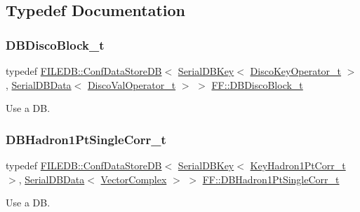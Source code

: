 \subsection{Typedef Documentation}
\mbox{\label{namespaceFF_afff37fccef0384964e1f8a8d20451ede}} 
\subsubsection{\texorpdfstring{DBDiscoBlock\_t}{DBDiscoBlock\_t}}
{\footnotesize\ttfamily typedef \mbox{\hyperlink{classFILEDB_1_1ConfDataStoreDB}{F\+I\+L\+E\+D\+B\+::\+Conf\+Data\+Store\+DB}}$<$ \mbox{\hyperlink{classADATIO_1_1SerialDBKey}{Serial\+D\+B\+Key}}$<$ \mbox{\hyperlink{structFF_1_1DiscoKeyOperator__t}{Disco\+Key\+Operator\+\_\+t}} $>$, \mbox{\hyperlink{classADATIO_1_1SerialDBData}{Serial\+D\+B\+Data}}$<$ \mbox{\hyperlink{classFF_1_1DiscoValOperator__t}{Disco\+Val\+Operator\+\_\+t}} $>$ $>$ \mbox{\hyperlink{namespaceFF_afff37fccef0384964e1f8a8d20451ede}{F\+F\+::\+D\+B\+Disco\+Block\+\_\+t}}}



Use a DB. 

\mbox{\label{namespaceFF_a6362d8690a549c09730022375eb4a613}} 
\subsubsection{\texorpdfstring{DBHadron1PtSingleCorr\_t}{DBHadron1PtSingleCorr\_t}}
{\footnotesize\ttfamily typedef \mbox{\hyperlink{classFILEDB_1_1ConfDataStoreDB}{F\+I\+L\+E\+D\+B\+::\+Conf\+Data\+Store\+DB}}$<$ \mbox{\hyperlink{classADATIO_1_1SerialDBKey}{Serial\+D\+B\+Key}}$<$ \mbox{\hyperlink{structFF_1_1KeyHadron1PtCorr__t}{Key\+Hadron1\+Pt\+Corr\+\_\+t}} $>$, \mbox{\hyperlink{classADATIO_1_1SerialDBData}{Serial\+D\+B\+Data}}$<$ \mbox{\hyperlink{group__defs_gab151d837d71acacce0e1c38e91e04fa3}{Vector\+Complex}} $>$ $>$ \mbox{\hyperlink{namespaceFF_a6362d8690a549c09730022375eb4a613}{F\+F\+::\+D\+B\+Hadron1\+Pt\+Single\+Corr\+\_\+t}}}



Use a DB. 

\mbox{\label{namespaceFF_a01cd8ed6e36964833ba6609588a44ad0}} 
